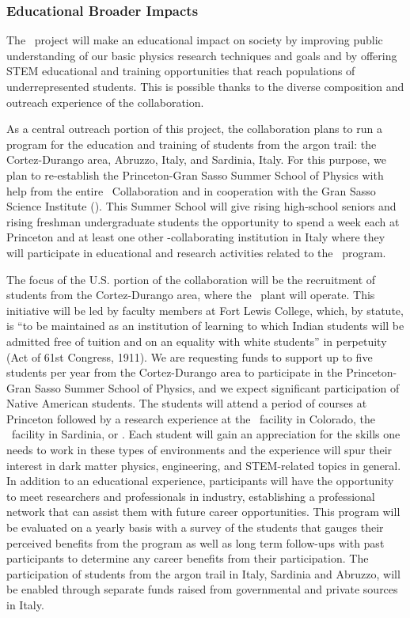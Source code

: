 \vspace{0.15in}

\subsubsection{Educational Broader Impacts}
The \DSk\ project will make an educational impact on society by improving public understanding of our basic physics research techniques and goals and by offering STEM educational and training opportunities that reach populations of underrepresented students. This is possible thanks to the diverse composition and outreach experience of the collaboration.  

As a central outreach portion of this project, the collaboration plans to run a program for the education and training of students from the argon trail: the Cortez-Durango area, Abruzzo, Italy, and Sardinia, Italy. For this purpose, we plan to re-establish the Princeton-Gran Sasso Summer School of Physics with help from the entire \DS\ Collaboration and in cooperation with the Gran Sasso Science Institute (\GSSI). This Summer School will give rising high-school seniors and rising freshman undergraduate students the opportunity to spend a week each at Princeton and at least one other \DS-collaborating institution in Italy where they will participate in educational and research activities related to the \DSs\ program. 

The focus of the U.S. portion of the collaboration will be the recruitment of students from the Cortez-Durango area, where the \Urania\ plant will operate.  This initiative will be led by faculty members at Fort Lewis College, which, by statute, is ``to be maintained as an institution of learning to which Indian students will be admitted free of tuition and on an equality with white students'' in perpetuity (Act of 61st Congress, 1911). We are requesting funds to support up to five students per year from the Cortez-Durango area to participate in the Princeton-Gran Sasso Summer School of Physics, and we expect significant participation of Native American students.  The students will attend a period of courses at Princeton followed by a research experience at the \Urania\ facility in Colorado, the \Aria\ facility in Sardinia, or \LNGS.  Each student will gain an appreciation for the skills one needs to work in these types of environments and the experience will spur their interest in dark matter physics, engineering, and STEM-related topics in general.  In addition to an educational experience, participants will have the opportunity to meet researchers and professionals in industry, establishing a professional network that can assist them with future career opportunities.  This program will be evaluated on a yearly basis with a survey of the students that gauges their perceived benefits from the program as well as long term follow-ups with past participants to determine any career benefits from their participation. The participation of students from the argon trail in Italy, Sardinia and Abruzzo, will be enabled through separate funds raised from governmental and private sources in Italy.

